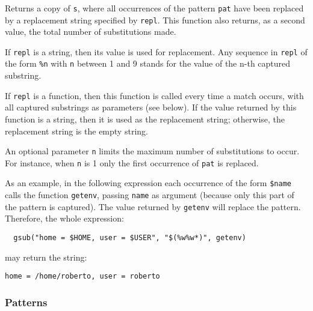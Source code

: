 \subsubsection*{}
Returns a copy of \verb-s-,
where all occurrences of the pattern \verb-pat- have been
replaced by a replacement string specified by \verb-repl-.
This function also returns, as a second value,
the total number of substitutions made.

If \verb-repl- is a string, then its value is used for replacement.
Any sequence in \verb-repl- of the form \verb-%n-
with \verb-n- between 1 and 9
stands for the value of the n-th captured substring.

If \verb-repl- is a function, then this function is called every time a
match occurs, with all captured substrings as parameters
(see below).
If the value returned by this function is a string,
then it is used as the replacement string;
otherwise, the replacement string is the empty string.

An optional parameter \verb-n- limits 
the maximum number of substitutions to occur.
For instance, when \verb-n- is 1 only the first occurrence of
\verb-pat- is replaced.

As an example, in the following expression each occurrence of the form
\verb-$name- calls the function \verb|getenv|,
passing \verb|name| as argument
(because only this part of the pattern is captured).
The value returned by \verb|getenv| will replace the pattern.
Therefore, the whole expression:
\begin{verbatim}
  gsub("home = $HOME, user = $USER", "$(%w%w*)", getenv)
\end{verbatim}
may return the string:
\begin{verbatim}
home = /home/roberto, user = roberto
\end{verbatim}

\subsubsection*{Patterns} \label{pm}

